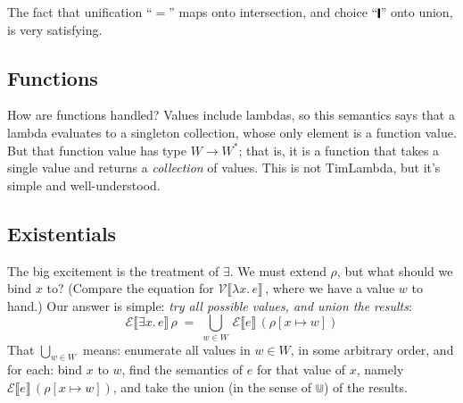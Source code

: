 \documentclass[acmsmall,review,dvipsnames]{acmart}
\newcommand{\Varid}[1]{\mathit{#1}}
\newcommand{\Value}{W}
\newcommand{\semfun}[1]{\mathcal{#1}}
\newcommand{\semapp}[3]{\semfun{#1}\llbracket #2 \rrbracket\, #3}
\newcommand{\extendrho}[2]{#1[#2]}
\newcommand{\mtype}{\Value^{*}}
\newcommand{\munion}{\Cup}
\newcommand{\wrong}{\mathbf{wrong}}
\begin{document}
The fact that unification ``\ensuremath{\mathrel{=}}'' maps onto intersection, and choice ``\ensuremath{\rule[-0.1em]{0.15em}{0.75em}}'' onto union, is
very satisfying.

\subsection{Functions}

How are functions handled?
Values include lambdas, so this semantics says that a lambda evaluates to a singleton
collection, whose only element is a function value. But that function value has
type $\Value \rightarrow \mtype$; that is, it is a function that takes a single
value and returns a \emph{collection} of values.  This is not TimLambda, but it's simple and well-understood.

% 

\subsection{Existentials} \label{sec:unification-and-equality}

The big excitement is the treatment of \ensuremath{\exists{}}. We must extend $\rho$, but what should we bind \ensuremath{\Varid{x}} to?  (Compare the
equation for $\semapp{V}{\ensuremath{\lambda\Varid{x}.\,\Varid{e}}}{}$, where we have a value $w$ to hand.)
Our answer is simple: \emph{try all possible values, and union the results}:
$$
\semapp{E}{\ensuremath{\exists\Varid{x}.\,\Varid{e}}}{\rho} \; = \; \bigcup_{w \in \Value}\, \semapp{E}{e}{(\extendrho{\rho}{x \mapsto w})}
$$
That $\bigcup_{w \in \Value}$ means: enumerate all values in $w \in \Value$, in some arbitrary order,
and for each: bind $x$ to $w$, find the semantics of $e$ for that value of $x$, namely
$\semapp{E}{e}{(\extendrho{\rho}{x \mapsto w})}$, and take the union
(in the sense of $\munion$) of the results.
\end{document}
